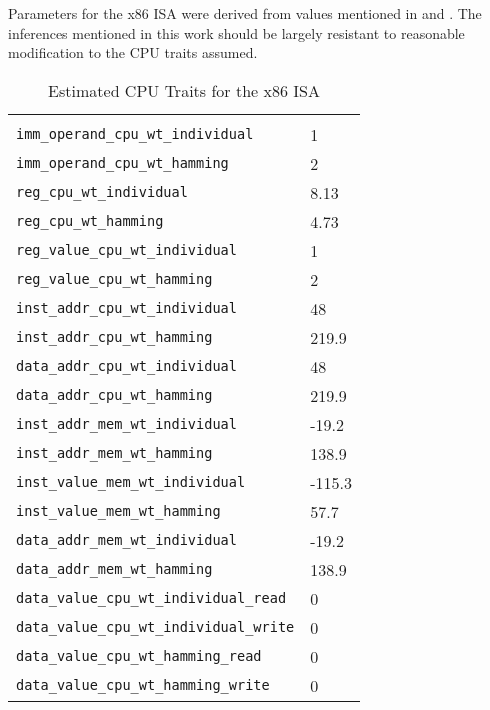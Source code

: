 Parameters for the x86 ISA were derived from values mentioned in
\cite{steinke} and \cite{lee}.  The inferences mentioned in this work
should be largely resistant to reasonable modification to the CPU
traits assumed.

\begin{longtable}{l|l}
  \caption{Estimated CPU Traits for the x86 ISA} \\

  \hline \\

  \texttt{imm\_operand\_cpu\_wt\_individual} & 1 \\
  \texttt{imm\_operand\_cpu\_wt\_hamming} & 2 \\

  \texttt{reg\_cpu\_wt\_individual} & 8.13 \\
  \texttt{reg\_cpu\_wt\_hamming} & 4.73 \\

  \texttt{reg\_value\_cpu\_wt\_individual} & 1 \\
  \texttt{reg\_value\_cpu\_wt\_hamming} & 2 \\

  \texttt{inst\_addr\_cpu\_wt\_individual} & 48 \\
  \texttt{inst\_addr\_cpu\_wt\_hamming} & 219.9 \\

  \texttt{data\_addr\_cpu\_wt\_individual} & 48 \\
  \texttt{data\_addr\_cpu\_wt\_hamming} & 219.9 \\

  \texttt{inst\_addr\_mem\_wt\_individual} & -19.2 \\
  \texttt{inst\_addr\_mem\_wt\_hamming} & 138.9 \\

  \texttt{inst\_value\_mem\_wt\_individual} & -115.3 \\
  \texttt{inst\_value\_mem\_wt\_hamming} & 57.7 \\

  \texttt{data\_addr\_mem\_wt\_individual} & -19.2 \\
  \texttt{data\_addr\_mem\_wt\_hamming} & 138.9 \\

  \texttt{data\_value\_cpu\_wt\_individual\_read} & 0 \\
  \texttt{data\_value\_cpu\_wt\_individual\_write} & 0 \\

  \texttt{data\_value\_cpu\_wt\_hamming\_read} & 0 \\
  \texttt{data\_value\_cpu\_wt\_hamming\_write} & 0 \\


\end{longtable}
